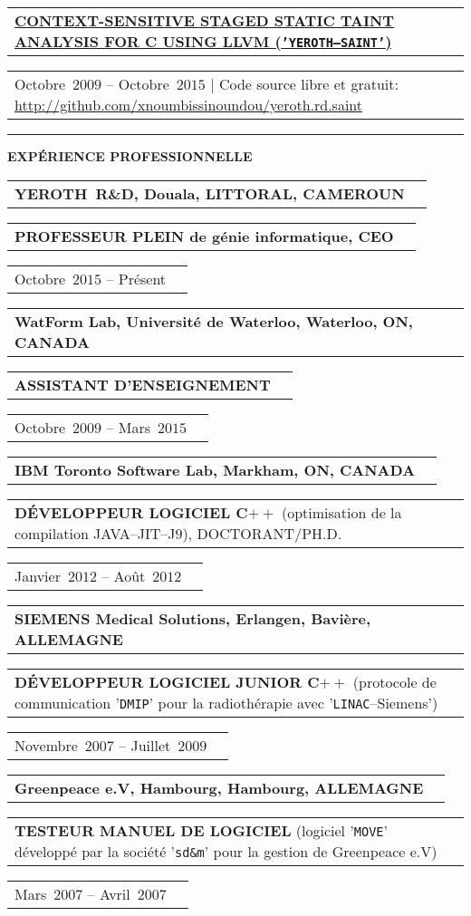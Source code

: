 \documentclass[9pt,a4paper]{article} %
\makeatletter
\newcommand{\headerrow}[2]
{\begin{tabular*}{\linewidth}{l@{\extracolsep{\fill}}r}
	#1 &
	#2 \\
\end{tabular*}}
\newcommand{\headerrowONE}[1]{\headerrow{#1}{}}
\newcommand{\cplusplus}{C$++$\xspace}
\newcommand{\cvitemdate}[2]{#1~$#2$\xspace}
\newcommand{\cvitempositionheld}[1]{\textbf{#1}\xspace}
\makeatother
\begin{document}
\vspace{0.3em}

\headerrowONE{\href{http://archive.org/details/yeroth-saint}{\textbf{CONTEXT-SENSITIVE STAGED STATIC TAINT ANALYSIS FOR C USING LLVM (\texttt{'YEROTH--SAINT'})}}}
\headerrowONE{\cvitemdate{Octobre}{2009} -- \cvitemdate{Octobre}{2015} | Code source libre et gratuit: \url{http://github.com/xnoumbissinoundou/yeroth.rd.saint}}
	
\vspace{1em}


\hrule
\begin{center}
{\large \textbf{EXPÉRIENCE PROFESSIONNELLE}}
\end{center}

\vspace{0.5em}

\headerrowONE{\textbf{YEROTH~R\&D, Douala, LITTORAL, CAMEROUN}}
\headerrowONE{\cvitempositionheld{PROFESSEUR PLEIN de génie informatique, CEO}}
\headerrowONE{\cvitemdate{Octobre}{2015} -- Présent}	

\vspace{0.3em}

\headerrowONE{\textbf{WatForm Lab, Université de Waterloo, Waterloo, ON, CANADA}}	
\headerrowONE{\cvitempositionheld{ASSISTANT D'ENSEIGNEMENT}}
\headerrowONE{\cvitemdate{Octobre}{2009} -- \cvitemdate{Mars}{2015}}
	
\vspace{0.3em}

\headerrowONE{\textbf{IBM Toronto Software Lab, Markham, ON, CANADA}}	
\headerrowONE{\cvitempositionheld{DÉVELOPPEUR LOGICIEL \cplusplus} (optimisation de la compilation JAVA--JIT--J$9$), DOCTORANT/PH.D.}
\headerrowONE{\cvitemdate{Janvier}{2012} -- \cvitemdate{Août}{2012}}	

\vspace{0.3em}

\headerrowONE{\textbf{SIEMENS Medical Solutions, Erlangen, Bavière, ALLEMAGNE}}	
\headerrowONE{\cvitempositionheld{DÉVELOPPEUR LOGICIEL JUNIOR \cplusplus} (protocole 
de communication '\texttt{DMIP}' pour la radiothérapie avec '\texttt{LINAC}--Siemens')}
\headerrowONE{\cvitemdate{Novembre}{2007} -- \cvitemdate{Juillet}{2009}}	
	
\vspace{0.3em}

\headerrowONE{\textbf{Greenpeace e.V, Hambourg, Hambourg, ALLEMAGNE}}	
\headerrowONE{\cvitempositionheld{TESTEUR MANUEL DE LOGICIEL} 
(logiciel '\texttt{MOVE}' développé par la société '\texttt{sd\&m}' pour la gestion de Greenpeace e.V)}
\headerrowONE{\cvitemdate{Mars}{2007} -- \cvitemdate{Avril}{2007}}	
\end{document}
